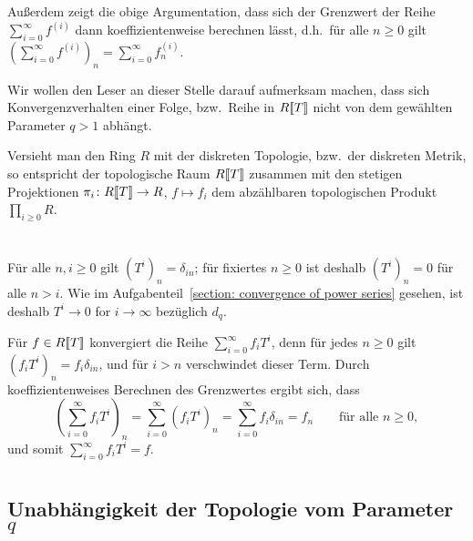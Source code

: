 \documentclass[a4paper, 10pt, numbers=noenddot]{scrartcl}
\begin{document}
Außerdem zeigt die obige Argumentation, dass sich der Grenzwert der Reihe $\sum_{i=0}^\infty f^{(i)}$ dann koeffizientenweise berechnen lässt, d.h.\ für alle $n \geq 0$ gilt $(\sum_{i=0}^\infty f^{(i)})_n = \sum_{i=0}^\infty f^{(i)}_n$.

Wir wollen den Leser an dieser Stelle darauf aufmerksam machen, dass sich Konvergenzverhalten einer Folge, bzw.\ Reihe in $R[\![T]\!]$ nicht von dem gewählten Parameter $q > 1$ abhängt.

\begin{remark}
  Versieht man den Ring $R$ mit der diskreten Topologie, bzw.\ der diskreten Metrik, so entspricht der topologische Raum $R[\![T]\!]$ zusammen mit den stetigen Projektionen $\pi_i \colon R[\![T]\!] \to R$, $f \mapsto f_i$ dem abzählbaren topologischen Produkt $\prod_{i \geq 0} R$.
\end{remark}





\section{}

Für alle $n, i \geq 0$ gilt $(T^i)_n = \delta_{in}$;
für fixiertes $n \geq 0$ ist deshalb $(T^i)_n = 0$ für alle $n > i$.
Wie im Aufgabenteil~\ref{section: convergence of power series} gesehen, ist deshalb $T^i \to 0$ for $i \to \infty$ bezüglich $d_q$.

Für $f \in R[\![T]\!]$ konvergiert die Reihe $\sum_{i=0}^\infty f_i T^i$, denn für jedes $n \geq 0$ gilt \mbox{$(f_i T^i)_n = f_i \delta_{in}$}, und für $i > n$ verschwindet dieser Term.
Durch koeffizientenweises Berechnen des Grenzwertes ergibt sich, dass
\[
    \left( \sum_{i=0}^\infty f_i T^i \right)_n
  = \sum_{i=0}^\infty (f_i T^i)_n
  = \sum_{i=0}^\infty f_i \delta_{in}
  = f_n
  \qquad
  \text{für alle $n \geq 0$},
\]
und somit $\sum_{i=0}^\infty f_i T^i = f$.





\section{}



\subsection*{Unabhängigkeit der Topologie vom Parameter $q$}
\end{document}
